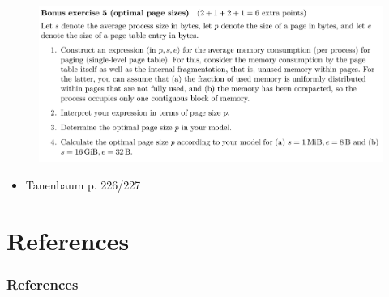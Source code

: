 \documentclass[10pt]{beamer}
\begin{document}
\begin{frame}{}
        \begin{figure}
          \includegraphics[keepaspectratio, width=\textwidth, height=\textheight-2\baselineskip]{img/ex6_104.png} \\
        \end{figure}
        \begin{itemize}
         \item Tanenbaum p. 226/227
        \end{itemize}
\end{frame}

\section{References}
    \begin{frame}[allowframebreaks]
      \frametitle{References}
      \begin{tiny}
      \nocite{*}
      \printbibliography
      \end{tiny}
    \end{frame}
\end{document}
